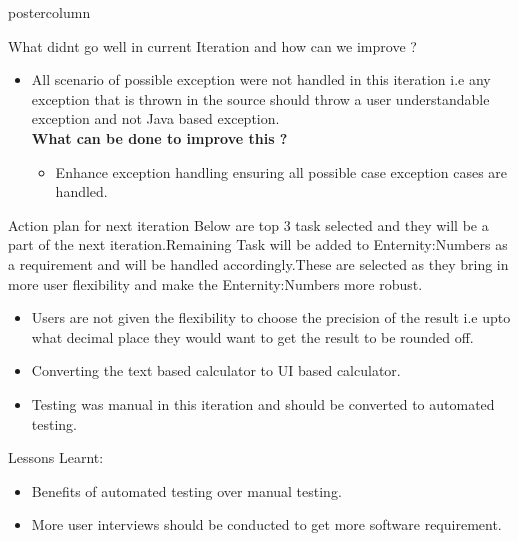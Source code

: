 \documentclass[final,hyperref={pdfpagelabels=false}]{beamer}
\begin{document}
\begin{frame}
\begin{columns}
\begin{column}{.49\textwidth}
\begin{beamercolorbox}[center,wd=\textwidth]{postercolumn}
\begin{minipage}[T]{.95\textwidth}
{\begin{block}{\smallskip What didnt go well in current Iteration and how can we improve ?}
\begin{itemize}
\begin{itemize}
                \end{itemize}
                    \item All scenario of possible exception were not handled in this iteration  i.e any exception that is thrown in the source should throw a user understandable exception and not Java based exception. \\
              \textbf{What can be done to improve this ?}
                \begin{itemize}
                \item Enhance exception handling ensuring all possible case exception cases are handled. 
            \end{itemize}
              \end{itemize}              
            
            \end{block}
            \vfill
              \begin{block}{Action plan for next iteration}
              Below are top 3 task selected and they will be a part of the next iteration.Remaining Task will be added to Enternity:Numbers as a requirement and will be handled accordingly.These are selected as they bring in more user flexibility and make the Enternity:Numbers more robust.
              \begin{itemize}
              \item  Users are not given the flexibility to choose the precision of the result i.e upto what decimal place they would want to get the result to be rounded off.
              \item Converting the text based calculator to UI based calculator.
              \item Testing was manual in this iteration and should be converted to automated testing.
               \end{itemize}              
            
            \end{block}
            \vfill
              \begin{block}{Lessons Learnt: }
              \begin{itemize}
              \item Benefits of automated testing over manual testing.
              \item More user interviews should be conducted to get more software requirement.
              \end{itemize}              
            

\end{block}}
\end{minipage}
\end{beamercolorbox}
\end{column}
\end{columns}
\end{frame}
\end{document}

